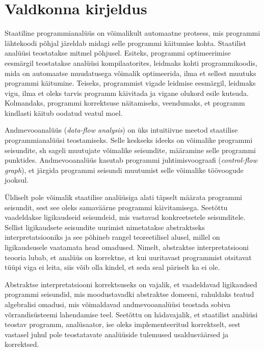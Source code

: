 \documentclass[thesis.tex]{subfiles}
\begin{document}
\section*{Valdkonna kirjeldus}


Staatiline programmianalüüs on võimalikult automaatne protsess, mis programmi lähtekoodi põhjal järeldab midagi selle programmi käitumise kohta. Staatilist analüüsi teostatakse mitmel põhjusel. Esiteks, programmi optimeerimise eesmärgil teostatakse analüüsi kompilaatorites, leidmaks kohti programmikoodis, mida on automaatse muudatusega võimalik optimeerida, ilma et sellest muutuks programmi käitumine. Teiseks, programmist vigade leidmise eesmärgil, leidmaks vigu, ilma et oleks tarvis programm käivitada ja vigane olukord esile kutsuda. Kolmandaks, programmi korrektsuse näitamiseks, veendumaks, et programm kindlasti käitub oodatud veatul moel.

Andmevooanalüüs (\emph{data-flow analysis}) on üks intuitiivne meetod staatilise programmianalüüsi teostamiseks. Selle keskseks ideeks on võimalike programmi seisundite, sh sageli muutujate võimalike seisundite, määramine selle programmi punktides. Andmevooanalüüs kasutab programmi juhtimisvoograafi (\emph{control-flow graph}), et järgida programmi seisundi muutumist selle võimalike töövoogude jooksul.

Üldiselt pole võimalik staatilise analüüsiga alati täpselt määrata programmi seisundit, sest see oleks samaväärne programmi käivitamisega. Seetõttu vaadeldakse ligikaudseid seisundeid, mis vastavad konkreetsetele seisunditele. Sellist ligikaudsete seisundite uurimist nimetatakse abstraktseks interpretatsiooniks ja see põhineb rangel teoreetilisel alusel, millel on ligikaudsusele vaatamata head omadused. Nimelt, abstraktse interpretatsiooni teooria lubab, et analüüs on korrektne, st kui uuritavast programmist otsitavat tüüpi viga ei leita, siis võib olla kindel, et seda seal päriselt ka ei ole.

Abstraktse interpretatsiooni korrektsuseks on vajalik, et vaadeldavad ligikaudsed programmi seisundid, mis moodustavadki abstraktse domeeni, rahuldaks teatud algebralisi omadusi, mis võimaldavad andmevooanalüüsi teostada sobiva võrrandisüsteemi lahendamise teel. Seetõttu on hädavajalik, et staatilist analüüsi teostav programm, analüsaator, ise oleks implementeeritud korrektselt, sest vastasel juhul pole teostatavate analüüside tulemused usaldusväärsed ja korrektsed.
\end{document}
